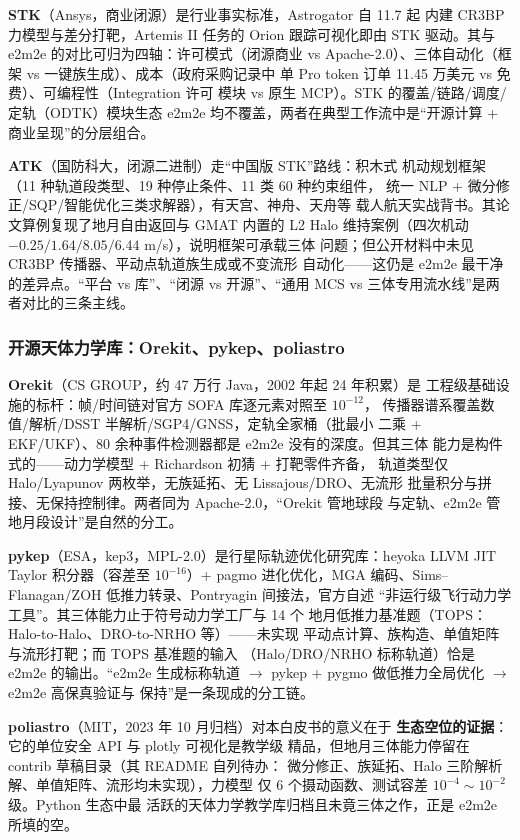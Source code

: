 \textbf{STK}（Ansys，商业闭源）是行业事实标准，Astrogator 自 11.7 起
内建 CR3BP 力模型与差分打靶，Artemis II 任务的 Orion 跟踪可视化即由
STK 驱动。其与 e2m2e 的对比可归为四轴：许可模式（闭源商业 vs
Apache-2.0）、三体自动化（框架 vs 一键族生成）、成本（政府采购记录中
单 Pro token 订单 11.45 万美元 vs 免费）、可编程性（Integration 许可
模块 vs 原生 MCP）。STK 的覆盖/链路/调度/定轨（ODTK）模块生态 e2m2e
均不覆盖，两者在典型工作流中是``开源计算 + 商业呈现''的分层组合。

\textbf{ATK}（国防科大，闭源二进制）走``中国版 STK''路线：积木式
机动规划框架（11 种轨道段类型、19 种停止条件、11 类 60 种约束组件，
统一 NLP + 微分修正/SQP/智能优化三类求解器），有天宫、神舟、天舟等
载人航天实战背书。其论文算例复现了地月自由返回与 GMAT 内置的 L2 Halo
维持案例（四次机动 $-0.25/1.64/8.05/6.44$ m/s），说明框架可承载三体
问题；但公开材料中未见 CR3BP 传播器、平动点轨道族生成或不变流形
自动化——这仍是 e2m2e 最干净的差异点。``平台 vs 库''、``闭源 vs
开源''、``通用 MCS vs 三体专用流水线''是两者对比的三条主线。

\subsubsection{开源天体力学库：Orekit、pykep、poliastro}

\textbf{Orekit}（CS GROUP，约 47 万行 Java，2002 年起 24 年积累）是
工程级基础设施的标杆：帧/时间链对官方 SOFA 库逐元素对照至 $10^{-12}$，
传播器谱系覆盖数值/解析/DSST 半解析/SGP4/GNSS，定轨全家桶（批最小
二乘 + EKF/UKF）、80 余种事件检测器都是 e2m2e 没有的深度。但其三体
能力是构件式的——动力学模型 + Richardson 初猜 + 打靶零件齐备，
轨道类型仅 Halo/Lyapunov 两枚举，无族延拓、无 Lissajous/DRO、无流形
批量积分与拼接、无保持控制律。两者同为 Apache-2.0，``Orekit 管地球段
与定轨、e2m2e 管地月段设计''是自然的分工。

\textbf{pykep}（ESA，kep3，MPL-2.0）是行星际轨迹优化研究库：heyoka
LLVM JIT Taylor 积分器（容差至 $10^{-16}$）+ pagmo 进化优化，MGA
编码、Sims--Flanagan/ZOH 低推力转录、Pontryagin 间接法，官方自述
``非运行级飞行动力学工具''。其三体能力止于符号动力学工厂与 14 个
地月低推力基准题（TOPS：Halo-to-Halo、DRO-to-NRHO 等）——未实现
平动点计算、族构造、单值矩阵与流形打靶；而 TOPS 基准题的输入
（Halo/DRO/NRHO 标称轨道）恰是 e2m2e 的输出。``e2m2e 生成标称轨道
$\to$ pykep + pygmo 做低推力全局优化 $\to$ e2m2e 高保真验证与
保持''是一条现成的分工链。

\textbf{poliastro}（MIT，2023 年 10 月归档）对本白皮书的意义在于
\textbf{生态空位的证据}：它的单位安全 API 与 plotly 可视化是教学级
精品，但地月三体能力停留在 contrib 草稿目录（其 README 自列待办：
微分修正、族延拓、Halo 三阶解析解、单值矩阵、流形均未实现），力模型
仅 6 个摄动函数、测试容差 $10^{-4}\sim10^{-2}$ 级。Python 生态中最
活跃的天体力学教学库归档且未竟三体之作，正是 e2m2e 所填的空。

